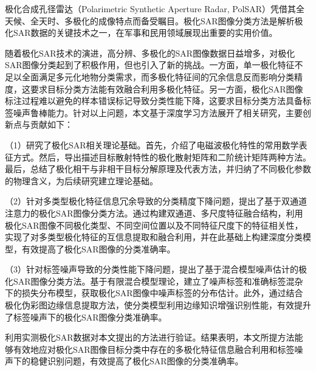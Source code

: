 \begin{chineseabstract}

    极化合成孔径雷达（Polarimetric Synthetic Aperture Radar, PolSAR）凭借其全天候、全天时、多极化的成像特点而备受瞩目。极化SAR图像分类方法是解析极化SAR数据的关键技术之一，在军事和民用领域展现出重要的实用价值。

    随着极化SAR技术的演进，高分辨、多极化的SAR图像数据日益增多，对极化SAR图像分类起到了积极作用，但也引入了新的挑战。一方面，单一极化特征不足以全面满足多元化地物分类需求，而多极化特征间的冗余信息反而影响分类精度，这要求目标分类方法能有效融合利用多极化特征。另一方面，极化SAR图像标注过程难以避免的样本错误标记导致分类性能下降，这要求目标分类方法具备标签噪声鲁棒能力。针对以上问题，本文基于深度学习方法展开了相关研究，主要创新点与贡献如下：

    （1）研究了极化SAR相关理论基础。首先，介绍了电磁波极化特性的常用数学表征方式。然后，导出描述目标散射特性的极化散射矩阵和二阶统计矩阵两种方法。最后，总结了极化相干与非相干目标分解原理及代表方法，并归纳了不同极化参数的物理含义，为后续研究建立理论基础。

    （2）针对多类型极化特征信息冗余导致的分类精度下降问题，提出了基于双通道注意力的极化SAR图像分类方法。通过构建双通道、多尺度特征融合结构，利用极化SAR图像不同极化类型、不同空间位置以及不同特征尺度下的特征相关性，实现了对多类型极化特征的互信息提取和融合利用，并在此基础上构建深度分类模型，有效提高了极化SAR图像的分类准确率。

    （3）针对标签噪声导致的分类性能下降问题，提出了基于混合模型噪声估计的极化SAR图像分类方法。基于有限混合模型理论，建立了噪声标签和准确标签混杂下的损失分布模型，获取极化SAR图像中噪声标签的分布估计。此外，通过结合极化伪彩图边缘信息提取方法，使分类模型利用边缘知识增强识别性能，有效提升了标签噪声下的极化SAR图像分类准确率。

    利用实测极化SAR数据对本文提出的方法进行验证。结果表明，本文所提方法能够有效地应对极化SAR图像目标分类中存在的多极化特征信息融合利用和标签噪声下的稳健识别问题，有效提高了极化SAR图像的分类准确率。


\end{chineseabstract}